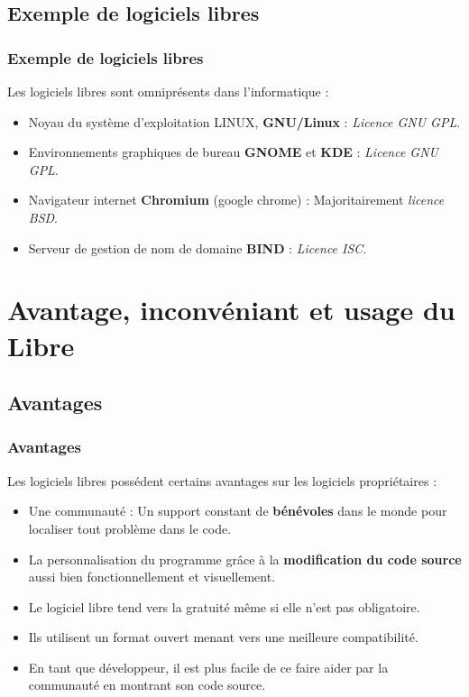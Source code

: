\documentclass{beamer}
\begin{document}
\subsection[Exemple de logiciels libres]{Exemple de logiciels libres}

\begin{frame}
	\frametitle{Exemple de logiciels libres}
	Les logiciels libres sont omniprésents dans l'informatique :
	\begin{itemize}
		\pause
		\item Noyau du système d'exploitation LINUX, \textbf{GNU/Linux} : \textit{Licence GNU GPL}.
		\pause
		\item Environnements graphiques de bureau \textbf{GNOME} et \textbf{KDE} : \textit{Licence GNU GPL}.
		\pause
		\item Navigateur internet \textbf{Chromium} (google chrome) : Majoritairement \textit{licence BSD}.
		\pause
		\item Serveur de gestion de nom de domaine \textbf{BIND} : \textit{Licence ISC}.
	\end{itemize}
\end{frame}

\section[Avantages/Inconvéniants]{Avantage, inconvéniant et usage du Libre}
\subsection[Avantages]{Avantages}

\begin{frame}
	\frametitle{Avantages}
	Les logiciels libres possédent certains avantages sur les logiciels propriétaires :
	\begin{itemize}
		\pause
		\item Une communauté : Un support constant de \textbf{bénévoles} dans le monde pour localiser tout problème dans le code.
		\pause
		\item La personnalisation du programme grâce à la \textbf{modification du code source} aussi bien fonctionnellement et visuellement.
		\pause
		\item Le logiciel libre tend vers la gratuité même si elle n'est pas obligatoire.
		\pause
		\item Ils utilisent un format ouvert menant vers une meilleure compatibilité.
		\pause
		\item En tant que développeur, il est plus facile de ce faire aider par la communauté en montrant son code source.
	\end{itemize}
\end{frame}
\end{document}
